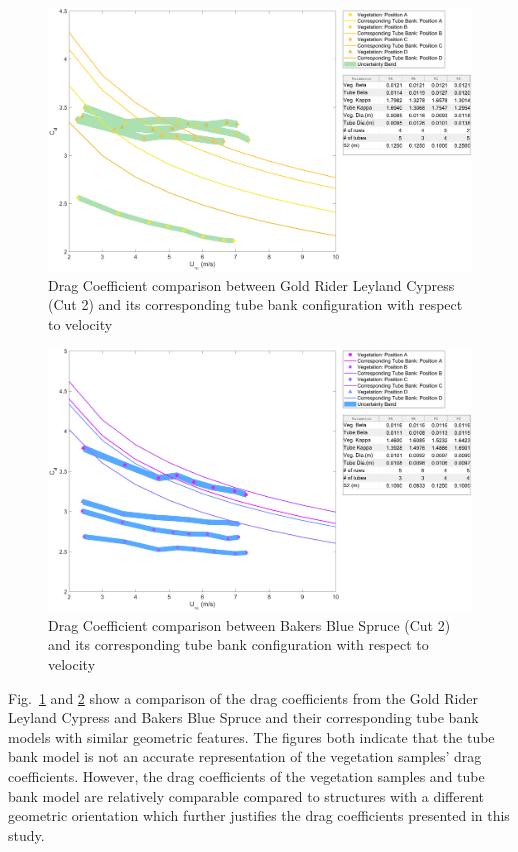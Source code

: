 \documentclass[12pt]{article}
\begin{document}
\begin{figure}[!]
	\centering 	
\includegraphics[width=\textwidth,keepaspectratio]{Picture13.pdf}
	\caption{Drag Coefficient comparison between Gold Rider Leyland Cypress (Cut 2) and its corresponding tube bank configuration with respect to velocity}
	\label{fig:TBGR}
\end{figure}

\begin{figure}[!]
	\centering 	
\includegraphics[width=\textwidth,keepaspectratio]{Picture14.pdf}
	\caption{Drag Coefficient comparison between Bakers Blue Spruce (Cut 2) and its corresponding tube bank configuration with respect to velocity}
	\label{fig:TBBB}
\end{figure}

Fig.~\ref{fig:TBGR} and \ref{fig:TBBB} show a comparison of the drag coefficients from the Gold Rider Leyland Cypress  and Bakers Blue Spruce and their corresponding tube bank models with similar geometric features. The figures both indicate that the tube bank model is not an accurate representation of the vegetation samples' drag coefficients. However, the drag coefficients of the vegetation samples and tube bank model are relatively comparable compared to structures with a different geometric orientation which further justifies the drag coefficients presented in this study.
\end{document}
